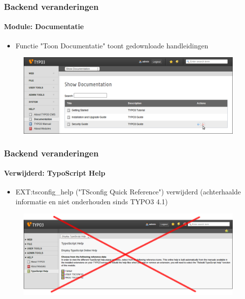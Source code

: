 \begin{frame}[fragile]
	\frametitle{Backend veranderingen}
	\framesubtitle{Module: Documentatie}

	\begin{itemize}
		\item Functie "Toon Documentatie" toont gedownloade handleidingen
	\end{itemize}

	\begin{figure}
		\includegraphics[width=0.95\linewidth]{Images/BackendChanges/ShowDocumentation.png}
	\end{figure}

\end{frame}


\begin{frame}[fragile]
	\frametitle{Backend veranderingen}
	\framesubtitle{Verwijderd: TypoScript Help}

 	\begin{itemize}
		\item EXT:tsconfig\_help ("TSconfig Quick Reference") verwijderd\newline
			\small(achterhaalde informatie en niet onderhouden sinds TYPO3 4.1)
	\end{itemize}

	\begin{figure}
		\includegraphics[width=0.95\linewidth]{Images/BackendChanges/TypoScriptHelpRemovedCrossed.png}
	\end{figure}

\end{frame}


